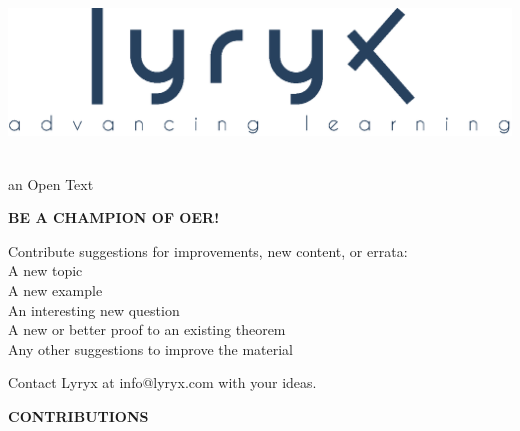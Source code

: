 \setcounter{page}{1}
\thispagestyle{empty}
\vspace{-3em}
\begin{center}
	\includegraphics[width=.4\textwidth]{figures/LyryxLogo.eps}
\end{center}

\vspace{-2em}

\begin{center}
 {\fontsize{24pt}{22pt}\selectfont \textcolor{titletextcolour}{\booksubtitle\;\booktitle}} \\ 
{\fontsize{16pt}{20pt}\selectfont \textcolor{titlemainbgcolour}{an Open Text}} 
\end{center}

\setlength{\parskip}{0pt}

\vfill

\begin{center} 
\fontsize{14pt}{16pt}\selectfont\textcolor{titletextcolour}{\textbf{BE A CHAMPION OF OER!}}
\end{center}

\begin{center}
Contribute suggestions for improvements, new content, or errata: \\
A new topic \\
A new example \\
An interesting new question \\
A new or better proof to an existing theorem \\
Any other suggestions to improve the material

\medskip

\noindent Contact Lyryx at \textcolor{titletextcolour}{info@lyryx.com} with your ideas.
\end{center}

\vfill

\begin{center}
\fontsize{14pt}{16pt}\selectfont\textcolor{titletextcolour}{\textbf{CONTRIBUTIONS}}
\end{center}

